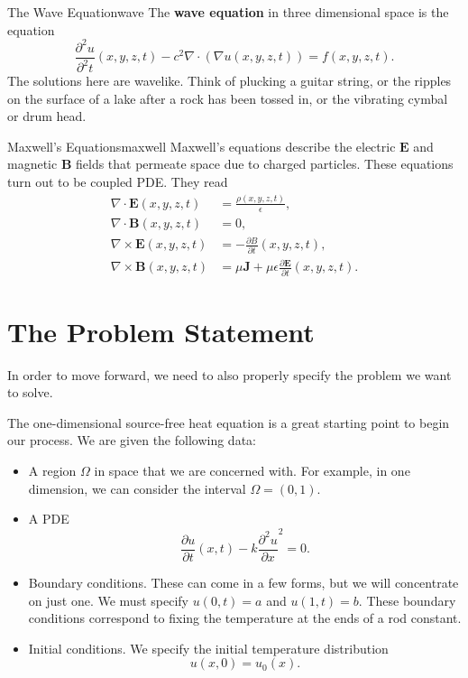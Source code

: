         \begin{ex}{The Wave Equation}{wave}
        The \textbf{wave equation} in three dimensional space is the equation
        \[
        \frac{\partial^2 u}{\partial^2 t}(x,y,z,t) -c^2\nabla \cdot (\nabla u(x,y,z,t)) = f(x,y,z,t).
        \]
        The solutions here are wavelike.  Think of plucking a guitar string, or the ripples on the surface of a lake after a rock has been tossed in, or the vibrating cymbal or drum head.
        \end{ex}
        
        \begin{ex}{Maxwell's Equations}{maxwell}
        Maxwell's equations describe the electric $\mathbf{E}$ and magnetic $\mathbf{B}$ fields that permeate space due to charged particles.  These equations turn out to be coupled PDE.  They read
        \begin{align*}
            \nabla \cdot \mathbf{E}(x,y,z,t) &= \frac{\rho(x,y,z,t)}{\epsilon},\\
            \nabla \cdot \mathbf{B}(x,y,z,t) &= 0,\\
            \nabla \times \mathbf{E}(x,y,z,t) &= -\frac{\partial B}{\partial t}(x,y,z,t),\\
            \nabla \times \mathbf{B}(x,y,z,t) &= \mu \mathbf{J} + \mu \epsilon \frac{\partial \mathbf{E}}{\partial t}(x,y,z,t).
        \end{align*}
        \end{ex}
        
        \section{The Problem Statement}
        
        In order to move forward, we need to also properly specify the problem we want to solve.
        
        The one-dimensional source-free heat equation is a great starting point to begin our process.  We are given the following data:
        \begin{itemize}
            \item A region $\Omega$ in space that we are concerned with.  For example, in one dimension, we can consider the interval $\Omega=(0,1)$.
            \item A PDE
            \[
            \frac{\partial u}{\partial t}(x,t) -k \frac{\partial^2 u}{\partial x}^2 = 0.
            \]
            \item Boundary conditions. These can come in a few forms, but we will concentrate on just one. We must specify $u(0,t)=a$ and $u(1,t)=b$.  These boundary conditions correspond to fixing the temperature at the ends of a rod constant.
            \item Initial conditions. We specify the initial temperature distribution
            \[
            u(x,0)=u_0(x).
            \]
        \end{itemize}
    

